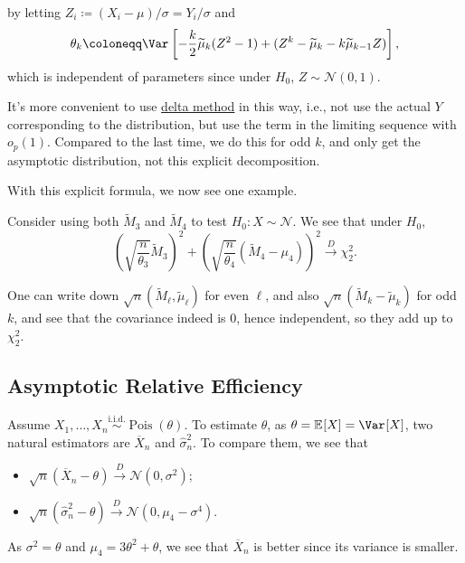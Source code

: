 by letting \(Z_i \coloneqq (X_i - \mu) / \sigma = Y_i / \sigma \) and
\[
	\theta _k
	\coloneqq \Var_{}\left[-\frac{k}{2} \widetilde{\mu} _k (Z^2 - 1) + (Z^k - \widetilde{\mu} _k - k \widetilde{\mu} _{k-1} Z ) \right],
\]
which is independent of parameters since under \(H_0\), \(Z \sim \mathcal{N} (0, 1)\).

\begin{note}
	It's more convenient to use \hyperref[thm:delta-method]{delta method} in this way, i.e., not use the actual \(Y\) corresponding to the distribution, but use the term in the limiting sequence with \(o_p(1)\). Compared to the last time, we do this for odd \(k\), and only get the asymptotic distribution, not this explicit decomposition.
\end{note}

With this explicit formula, we now see one example.

\begin{eg}
	Consider using both \(\widetilde{M} _3\) and \(\widetilde{M} _4\) to test \(H_0\colon X \sim \mathcal{N} \). We see that under \(H_0\),
	\[
		\left( \sqrt{\frac{n}{\theta _3}} \widetilde{M} _3 \right) ^2 + \left( \sqrt{\frac{n}{\theta _4}} (\widetilde{M} _4 - \mu _4) \right) ^2
		\overset{D}{\to} \chi _2^2 .
	\]
\end{eg}
\begin{explanation}
	One can write down \(\sqrt{n} (\widetilde{M} _\ell , \widetilde{\mu} _\ell )\) for even \(\ell \), and also \(\sqrt{n} (\widetilde{M} _k - \widetilde{\mu} _k)\) for odd \(k\), and see that the covariance indeed is \(0\), hence independent, so they add up to \(\chi _2^2\).
\end{explanation}

\subsection{Asymptotic Relative Efficiency}
Assume \(X_1, \dots , X_n \overset{\text{i.i.d.} }{\sim } \operatorname{Pois}(\theta ) \). To estimate \(\theta \), as \(\theta = \mathbb{E}_{}[X] = \Var_{}[X] \), two natural estimators are \(\overline{X} _n\) and \(\hat{\sigma} _n^2\). To compare them, we see that
\begin{itemize}
	\item \(\sqrt{n} (\overline{X} _n - \theta ) \overset{D}{\to} \mathcal{N} (0, \sigma ^2)\);
	\item \(\sqrt{n} (\hat{\sigma} _n^2 - \theta ) \overset{D}{\to} \mathcal{N} (0, \mu _4 - \sigma ^4)\).
\end{itemize}
As \(\sigma ^2 = \theta \) and \(\mu _4 = 3 \theta ^2 + \theta \), we see that \(\overline{X} _n\) is better since its variance is smaller.


